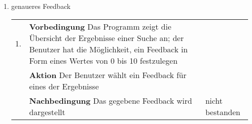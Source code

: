 \begin{enumerate} [label=\bfseries /TSW \arabic*0/, leftmargin=*]
	\item genaueres Feedback \label{ts:zehner_feedback} \newline \newline
	\begin{tabular}{rp{4in}|l}
	1. & \textbf{Vorbedingung} Das Programm zeigt die Übersicht der Ergebnisse einer Suche an; der Benutzer hat die Möglichkeit, ein Feedback in Form eines Wertes von 0 bis 10 festzulegen & \\
	   & \textbf{Aktion} Der Benutzer wählt ein Feedback für eines der Ergebnisse & \\
	   & \textbf{Nachbedingung} Das gegebene Feedback wird dargestellt & nicht bestanden \\
	\end{tabular}
\end{enumerate}
